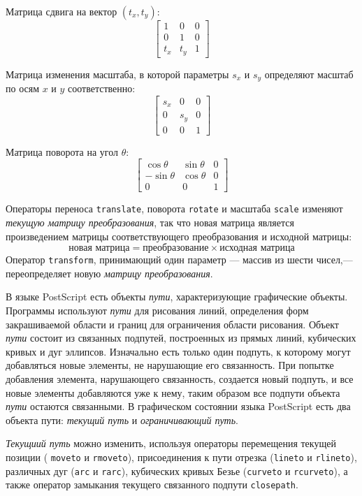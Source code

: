 Матрица сдвига на вектор $(t_x, t_y)$:
\[
\begin{bmatrix}
1 & 0 & 0 \\ 0 & 1 & 0 \\ t_x & t_y & 1
\end{bmatrix}
\]

Матрица изменения масштаба, в которой параметры $s_x$ и $s_y$ определяют масштаб по осям $x$ и $y$ соответственно:
\[
\begin{bmatrix}
s_x & 0 & 0 \\ 0 & s_y & 0 \\ 0 & 0 & 1
\end{bmatrix}
\]

Матрица поворота на угол $\theta$:
\[
\begin{bmatrix}
\cos \theta & \sin \theta & 0 \\ -\sin \theta & \cos \theta & 0 \\ 0 & 0 & 1
\end{bmatrix}
\]

 Операторы переноса \texttt{translate}, поворота \texttt{rotate} и масштаба \texttt{scale} изменяют \textit{текущую матрицу преобразования}, так что новая матрица является произведением матрицы соответствующего преобразования и исходной матрицы: 
\[ \texttt{новая матрица} = \texttt{преобразование} \times \texttt{исходная матрица} \]
Оператор \texttt{transform}, принимающий один параметр --- массив из шести чисел,--- переопределяет новую \textit{матрицу преобразования}. 

В языке PostScript есть объекты \textit{пути}, характеризующие графические объекты. Программы используют \textit{пути} для рисования линий, определения форм закрашиваемой области и границ для ограничения области рисования. 
Объект \textit{пути} состоит из связанных подпутей, построенных из прямых линий, кубических кривых и дуг эллипсов. Изначально есть только один подпуть, к которому могут добавляться новые элементы, не нарушающие его связанность. При попытке добавления элемента, нарушающего связанность, создается новый подпуть, и все новые элементы добавляются уже к нему, таким образом все подпути объекта \textit{пути} остаются связанными. В графическом состоянии языка PostScript есть два объекта пути: \textit{текущий путь} и \textit{ограничивающий путь}. 

\textit{Текущиий путь} можно изменить, используя операторы перемещения текущей позиции ( \texttt{moveto} и \texttt{rmoveto}), присоединения к пути отрезка (\texttt{lineto} и \texttt{rlineto}), различных дуг (\texttt{arc} и \texttt{rarc}), кубических кривых Безье (\texttt{curveto} и \texttt{rcurveto}), а также оператор замыкания текущего связанного подпути \texttt{closepath}.

